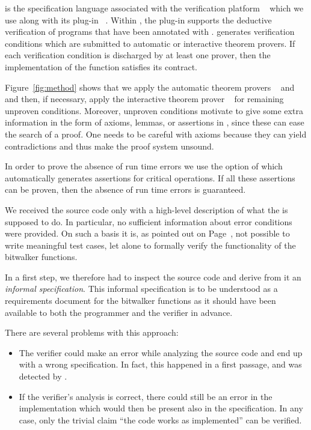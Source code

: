 \acsl is the specification language associated with 
the verification platform \framac~\cite{FramaC}
which we use along with its plug-in \framacwp~\cite{wp}.
Within \framac, the \wpframac plug-in supports
the deductive verification of \isoc programs that have been annotated with \acsl.
\framacwp generates verification conditions which are submitted to 
automatic or interactive theorem provers.
If each verification condition is discharged by at least one prover, then
the implementation of the function satisfies its contract.

Figure~\ref{fig:method} shows that we apply the automatic
theorem provers \altergo~\cite{alt-ergo} and \cvc~\cite{cvc}
and then, if necessary, apply the interactive theorem prover \coq~\cite{Coq}
for remaining unproven conditions.
Moreover, unproven conditions motivate to give some extra information
in the form of axioms, lemmas, or assertions in \acsl, 
since these can ease the search of a proof.
One needs to be careful with axioms because they can yield contradictions
and thus make the proof system unsound.

In order to prove the absence of run time errors we use
the  option of \wpframac which automatically generates \acsl
assertions for critical operations.
If all these assertions can be proven, then
the absence of run time errors is guaranteed.


We received the source code only with a high-level description
of what the \bitwalker is supposed to do.
In particular, no sufficient information about error conditions were provided.
On such a basis it is, as pointed out on Page~\pageref{lesson},
not possible to write meaningful test cases,
let alone to formally verify the functionality of the bitwalker functions.

In a first step, we therefore had to inspect the source code and 
derive from it an \emph{informal specification}.
This informal specification is to be understood
as a requirements document for the bitwalker functions as it should have been
available to both the programmer and the verifier in advance.

There are several problems with this approach:
\begin{itemize}
\item
The verifier could make an error while analyzing the source code
and end up with a wrong specification. 
In fact, this happened in a first passage, and was detected by \framacwp.

\item
If the verifier's analysis is correct,
there could still be an error in the implementation which would then be present also
in the specification. In any case, only the trivial claim ``the code
works as implemented'' can be verified.
\end{itemize}

